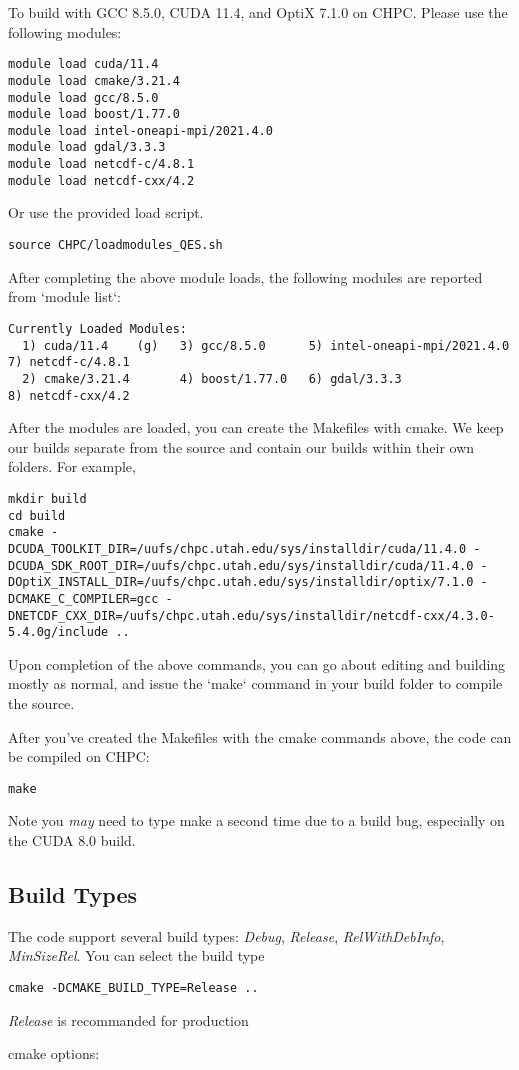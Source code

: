 To build with GCC 8.5.0, CUDA 11.4, and OptiX 7.1.0 on CHPC. Please use the following modules:
\begin{verbatim}
module load cuda/11.4
module load cmake/3.21.4
module load gcc/8.5.0
module load boost/1.77.0
module load intel-oneapi-mpi/2021.4.0
module load gdal/3.3.3
module load netcdf-c/4.8.1
module load netcdf-cxx/4.2
\end{verbatim}
Or use the provided load script.
\begin{verbatim}
source CHPC/loadmodules_QES.sh
\end{verbatim}
After completing the above module loads, the following modules are reported from `module list`:
\begin{verbatim}
Currently Loaded Modules:
  1) cuda/11.4    (g)   3) gcc/8.5.0      5) intel-oneapi-mpi/2021.4.0   7) netcdf-c/4.8.1
  2) cmake/3.21.4       4) boost/1.77.0   6) gdal/3.3.3                  8) netcdf-cxx/4.2
\end{verbatim}
After the modules are loaded, you can create the Makefiles with cmake.  We keep our builds separate from the source and contain our builds within their own folders.  For example, 
\begin{verbatim}
mkdir build
cd build
cmake -DCUDA_TOOLKIT_DIR=/uufs/chpc.utah.edu/sys/installdir/cuda/11.4.0 -DCUDA_SDK_ROOT_DIR=/uufs/chpc.utah.edu/sys/installdir/cuda/11.4.0 -DOptiX_INSTALL_DIR=/uufs/chpc.utah.edu/sys/installdir/optix/7.1.0 -DCMAKE_C_COMPILER=gcc -DNETCDF_CXX_DIR=/uufs/chpc.utah.edu/sys/installdir/netcdf-cxx/4.3.0-5.4.0g/include ..
\end{verbatim}
Upon completion of the above commands, you can go about editing and building mostly as normal, and issue the `make` command in your build folder to compile the source.

After you've created the Makefiles with the cmake commands above, the code can be compiled on CHPC:
\begin{verbatim}
make
\end{verbatim}
Note you \textit{may} need to type make a second time due to a build bug, especially on the CUDA 8.0 build.

\subsection{Build Types}

The code support several build types: \textit{Debug}, \textit{Release}, \textit{RelWithDebInfo}, \textit{MinSizeRel}. You can select the build type
\begin{verbatim}
cmake -DCMAKE_BUILD_TYPE=Release ..
\end{verbatim}
\textit{Release} is recommanded for production

cmake options: